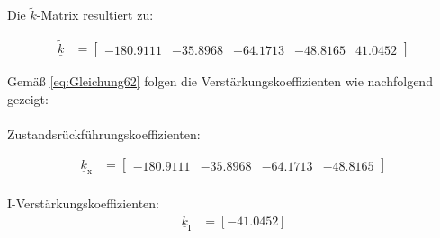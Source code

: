 Die $\underline{\tilde{k}}$-Matrix resultiert zu:

\begin{align}\label{eq:Gleichung68}
    \underline{\tilde{k}} &= 
    \begin{bmatrix}
        -180.9111 & -35.8968 & -64.1713 & -48.8165 & 41.0452
    \end{bmatrix}
\end{align}

Gemäß \autoref{eq:Gleichung62} folgen die Verstärkungskoeffizienten wie nachfolgend gezeigt:\\\\
Zustandsrückführungskoeffizienten:

\begin{align}\label{eq:Gleichung69}
    \underline{k}_{\mathrm{x}} &= 
    \begin{bmatrix}
        -180.9111 & -35.8968 & -64.1713 & -48.8165
    \end{bmatrix}
\end{align}\\
I-Verstärkungskoeffizienten:
\begin{align}\label{eq:Gleichugn70}
    \underline{k}_{\mathrm{I}} &= [-41.0452]
\end{align}